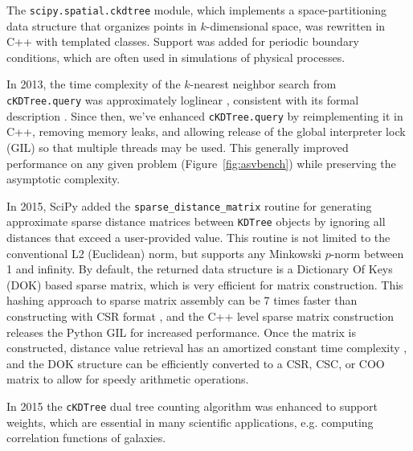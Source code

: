 The \texttt{scipy.spatial.ckdtree} module, which implements a space-partitioning data structure that
organizes points in $k$-dimensional space, was rewritten in C++ with templated classes. 
Support was added for periodic boundary conditions, which are often used 
in simulations of physical processes. 

In 2013, the time complexity of the $k$-nearest neighbor search from
\texttt{cKDTree.query} was approximately loglinear \cite{knn-jake},
consistent with its formal description \cite{kdtree-search-algo}.
Since then, we've enhanced \texttt{cKDTree.query} by reimplementing it in
C++, removing memory leaks, and allowing release of the global interpreter lock (GIL) so that
multiple threads may be used\cite{gh-4374}. This generally improved
performance on any given problem (Figure~\ref{fig:asvbench})
while preserving the asymptotic complexity.

In 2015, SciPy added the \texttt{sparse\_distance\_matrix} routine for generating 
approximate sparse distance matrices between \texttt{KDTree} objects by ignoring 
all distances that exceed a user-provided value. This routine is not 
limited to the conventional L2 (Euclidean) norm, but supports any Minkowski 
$p$-norm between 1 and infinity. By default, the returned data structure is a
Dictionary Of Keys (DOK) based sparse matrix, which is very efficient for matrix 
construction. This hashing approach to sparse matrix assembly can be 7 times 
faster than constructing with CSR format
\cite{10.1007/978-3-540-75755-9_107}, and the C++ level sparse matrix construction 
releases the Python GIL for increased performance. Once the matrix is constructed, 
distance value retrieval has an amortized constant time complexity 
\cite{Cormen:2001:IA:580470}, and the DOK structure can be efficiently converted 
to a CSR, CSC, or COO matrix to allow for 
speedy arithmetic operations.

In 2015 the \texttt{cKDTree} dual tree counting algorithm\cite{Moore2000ar}
was enhanced to support weights\cite{ckdtree-weights}, which are
essential in many scientific applications, e.g. computing correlation
functions of galaxies\cite{0004-637X-750-1-38}.
